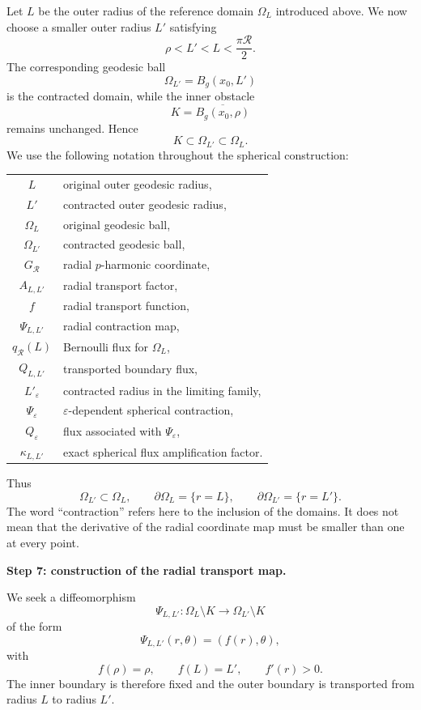 \documentclass[11pt,a4paper]{article}
\theoremstyle{definition}
\theoremstyle{remark}
\begin{document}
Let $L$ be the outer radius of the reference domain $\Omega_L$ introduced above.
We now choose a smaller outer radius $L'$ satisfying
\[
\rho<L'<L<\frac{\pi\mathcal R}{2}.
\]
The corresponding geodesic ball
\[
\Omega_{L'}=B_g(x_0,L')
\]
is the contracted domain, while the inner obstacle
\[
K=\overline{B_g(x_0,\rho)}
\]
remains unchanged. Hence
\[
K\subset\Omega_{L'}\subset\Omega_L.
\]
We use the following notation throughout the spherical construction:
\begin{center}
\begin{tabular}{c|l}
$L$ & original outer geodesic radius,\\
$L'$ & contracted outer geodesic radius,\\
$\Omega_L$ & original geodesic ball,\\
$\Omega_{L'}$ & contracted geodesic ball,\\
$G_{\mathcal R}$ & radial $p$-harmonic coordinate,\\
$A_{L,L'}$ & radial transport factor,\\
$f$ & radial transport function,\\
$\Psi_{L,L'}$ & radial contraction map,\\
$q_{\mathcal R}(L)$ & Bernoulli flux for $\Omega_L$,\\
$Q_{L,L'}$ & transported boundary flux,\\
$L'_{\varepsilon}$ & contracted radius in the limiting family,\\
$\Psi_{\varepsilon}$ & $\varepsilon$-dependent spherical contraction,\\
$Q_{\varepsilon}$ & flux associated with $\Psi_{\varepsilon}$,\\
$\kappa_{L,L'}$ & exact spherical flux amplification factor.
\end{tabular}
\end{center}
Thus
\[
\Omega_{L'}\subset\Omega_L,
\qquad
\partial\Omega_L=\{r=L\},
\qquad
\partial\Omega_{L'}=\{r=L'\}.
\]
The word ``contraction'' refers here to the inclusion of the domains.
It does not mean that the derivative of the radial coordinate map must be
smaller than one at every point.

\medskip
\noindent
\textbf{Step 7: construction of the radial transport map.}

We seek a diffeomorphism
\[
\Psi_{L,L'}:\Omega_L\setminus K
\longrightarrow\Omega_{L'}\setminus K
\]
of the form
\[
\Psi_{L,L'}(r,\theta)=(f(r),\theta),
\]
with
\[
f(\rho)=\rho,
\qquad
f(L)=L',
\qquad
f'(r)>0.
\]
The inner boundary is therefore fixed and the outer boundary is transported
from radius $L$ to radius $L'$.
\end{document}

